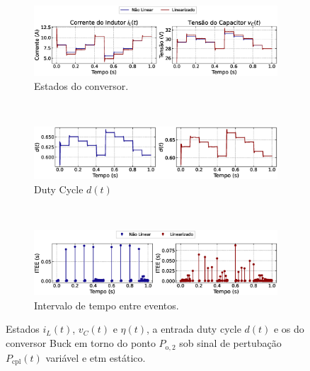 \begin{figure}[H]
  \centering
  \captionsetup{justification=centering}
  \begin{subfigure}{1.\textwidth}
    \centering
    \includegraphics[width=1.\textwidth]{figuras/dynamic-etm/buck/sim2/op2/result.eps}
    \caption{Estados do conversor.}
    \label{fig:buck_converter_variable_pcpl_dynamic_etm_op2_a}
  \end{subfigure}
  \\[6pt]
  \begin{subfigure}{1.\textwidth}
    \centering
    \includegraphics[width=1.\textwidth]{figuras/dynamic-etm/buck/sim2/op2/duty-cycle.eps}
    \caption{Duty Cycle $d(t)$}
    \label{fig:buck_converter_variable_pcpl_dynamic_etm_op2_b}
  \end{subfigure}
  \\[6pt]
  \begin{subfigure}{1.\textwidth}
    \centering
    \includegraphics[width=1.\textwidth]{figuras/dynamic-etm/buck/sim2/op2/inter-event-times.eps}
    \caption{Intervalo de tempo entre eventos.}
    \label{fig:buck_converter_variable_pcpl_dynamic_etm_op2_c}
  \end{subfigure}
  \caption{Estados $i_L(t)$, $v_C(t)$ e $\eta(t)$, a entrada duty cycle $d(t)$ e os  do conversor Buck em torno do ponto $P_{\mathrm{o}, 2}$ sob sinal de pertubação $P_{\mathrm{cpl}}(t)$ variável e \acrshort{etm} estático.}
  \label{fig:buck_converter_variable_pcpl_dynamic_etm_op2}
\end{figure}

